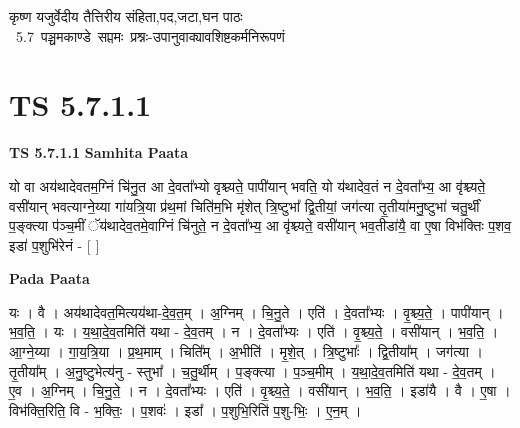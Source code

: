 \documentclass[17pt]{extarticle}
\begin{document}
\begin{titlepage}
    \begin{center}
 
\begin{sanskrit}
    { \Huge
    कृष्ण यजुर्वेदीय तैत्तिरीय संहिता,पद,जटा,घन पाठः 
    }
    \\
    \vspace{2.5cm}
    \mbox{ \Huge
    5.7      पञ्चमकाण्डे सप्तमः प्रश्नः-उपानुवाक्यावशिष्टकर्मनिरूपणं   }
\end{sanskrit}
\end{center}

\end{titlepage}
\tableofcontents
\pagebreak

\section*{ TS 5.7.1.1 }

\textbf{TS 5.7.1.1 } \newline
\textbf{Samhita Paata} \newline

यो वा अय॑थादेवतम॒ग्निं चि॑नु॒त आ दे॒वता᳚भ्यो वृश्च्यते॒ पापी॑यान् भवति॒ यो य॑थादेव॒तं न दे॒वता᳚भ्य॒ आ वृ॑श्च्यते॒ वसी॑यान् भवत्याग्ने॒य्या गा॑यत्रि॒या प्र॑थ॒मां चिति॑म॒भि मृ॑शेत् त्रि॒ष्टुभा᳚ द्वि॒तीयां॒ जग॑त्या तृ॒तीया॑मनु॒ष्टुभा॑ चतु॒र्थीं प॒ङ्क्त्या प॑ञ्च॒मीं ॅय॑थादेव॒तमे॒वाग्निं चि॑नुते॒ न दे॒वता᳚भ्य॒ आ वृ॑श्च्यते॒ वसी॑यान् भव॒तीडा॑यै॒ वा ए॒षा विभ॑क्तिः प॒शव॒ इडा॑ प॒शुभि॑रेनं - [  ] \newline

\textbf{Pada Paata} \newline

यः । वै । अय॑थादेवत॒मित्यय॑था-दे॒व॒त॒म् । अ॒ग्निम् । चि॒नु॒ते । एति॑ । दे॒वता᳚भ्यः । वृ॒श्च्य॒ते॒ । पापी॑यान् । भ॒व॒ति॒ । यः । य॒था॒दे॒व॒तमिति॑ यथा - दे॒व॒तम् । न । दे॒वता᳚भ्यः । एति॑ । वृ॒श्च्य॒ते॒ । वसी॑यान् । भ॒व॒ति॒ । आ॒ग्ने॒य्या । गा॒य॒त्रि॒या । प्र॒थ॒माम् । चिति᳚म् । अ॒भीति॑ । मृ॒शे॒त् । त्रि॒ष्टुभाः᳚ । द्वि॒तीया᳚म् । जग॑त्या । तृ॒तीया᳚म् । अ॒नु॒ष्टुभेत्य॑नु - स्तुभा᳚ । च॒तु॒र्थीम् । प॒ङ्क्त्या । प॒ञ्च॒मीम् । य॒था॒दे॒व॒तमिति॑ यथा - दे॒व॒तम् । ए॒व । अ॒ग्निम् । चि॒नु॒ते॒ । न । दे॒वता᳚भ्यः । एति॑ । वृ॒श्च्य॒ते॒ । वसी॑यान् । भ॒व॒ति॒ । इडा॑यै । वै । ए॒षा । विभ॑क्ति॒रिति॒ वि - भ॒क्तिः॒ । प॒शवः॑ । इडा᳚ । प॒शुभि॒रिति॑ प॒शु-भिः॒ । ए॒न॒म् ।  \newline
\end{document}
